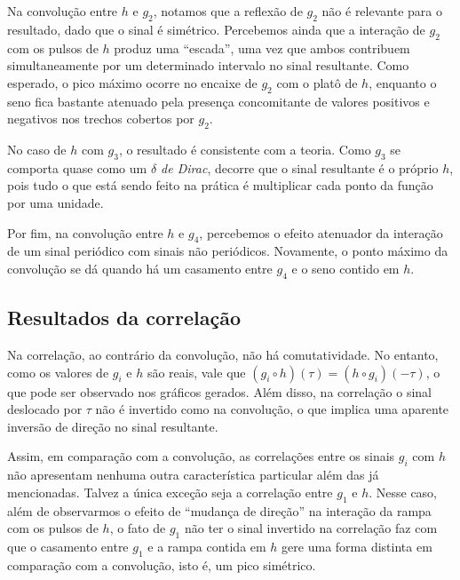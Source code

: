 \documentclass[12pt]{article}
\begin{document}
Na convolução entre $h$ e $g_2$, notamos que a reflexão de $g_2$ não é relevante para o resultado, dado que o sinal é simétrico. Percebemos ainda que a interação de $g_2$ com os pulsos de $h$ produz uma ``escada'', uma vez que ambos contribuem simultaneamente por um determinado intervalo no sinal resultante. Como esperado, o pico máximo ocorre no encaixe de $g_2$ com o platô de $h$, enquanto o seno fica bastante atenuado pela presença concomitante de valores positivos e negativos nos trechos cobertos por $g_2$.

No caso de $h$ com $g_3$, o resultado é consistente com a teoria. Como $g_3$ se comporta quase como um \textit{$\delta$ de Dirac}, decorre que o sinal resultante é o próprio $h$, pois tudo o que está sendo feito na prática é multiplicar cada ponto da função por uma unidade.

Por fim, na convolução entre $h$ e $g_4$, percebemos o efeito atenuador da interação de um sinal periódico com sinais não periódicos. Novamente, o ponto máximo da convolução se dá quando há um casamento entre $g_4$ e o seno contido em $h$.



\subsection{Resultados da correlação}
Na correlação, ao contrário da convolução, não há comutatividade. No entanto, como os valores de $g_i$ e $h$ são reais, vale que $(g_i \circ h)(\tau) = (h \circ g_i)(-\tau)$, o que pode ser observado nos gráficos gerados. Além disso, na correlação o sinal deslocado por $\tau$ não é invertido como na convolução, o que implica uma aparente inversão de direção no sinal resultante.

Assim, em comparação com a convolução, as correlações entre os sinais $g_i$ com $h$ não apresentam nenhuma outra característica particular além das já mencionadas. Talvez a única exceção seja a correlação entre $g_1$ e $h$. Nesse caso, além de observarmos o efeito de ``mudança de direção'' na interação da rampa com os pulsos de $h$, o fato de $g_1$ não ter o sinal invertido na correlação faz com que o casamento entre $g_1$ e a rampa contida em $h$ gere uma forma distinta em comparação com a convolução, isto é, um pico simétrico. 
\end{document}
